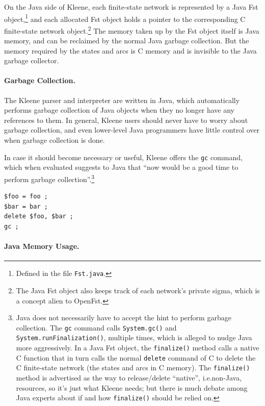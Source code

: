 \documentclass[letterpaper,12pt]{article}
\def\CPP{{C\nolinebreak[4]\hspace{-.08em}\raisebox{.3ex}{\footnotesize\bf
+}\nolinebreak\hspace{-.1em}\raisebox{.3ex}{\footnotesize\bf +}}}
\begin{document}
On the Java side of Kleene, each finite-state network is represented by a
Java Fst object,\footnote{Defined in the file \texttt{Fst.java}.} and
each allocated Fst object holds a pointer to the corresponding \CPP{}
finite-state network object.\footnote{The Java Fst object also keeps
track of each network's private sigma, which is a concept alien to
OpenFst.}  The memory taken up by the Fst object itself is Java memory,
and can be reclaimed by the normal Java garbage collection.  But the
memory required by the states and arcs is \CPP{} memory and is invisible
to the Java garbage collector.

\paragraph{Garbage Collection.}

The Kleene parser and interpreter are written in Java, which
automatically performs garbage collection of Java objects when they no
longer have any references to them.  In general, Kleene users should
never have to worry about garbage collection, and even lower-level Java
programmers have little control over when garbage collection is done.  

In case it should become necessary or useful, Kleene offers the
\texttt{gc} command, which when evaluated suggests to Java that ``now
would be a good time to perform garbage collection''.\footnote{Java does
not necessarily have to accept the hint to perform garbage collection.
The \texttt{gc} command calls \texttt{System.gc()} and
\texttt{System.runFinalization()}, multiple times, which is alleged to
nudge Java more aggressively.  In a Java Fst object, the
\texttt{finalize()} method calls a native \CPP{} function that in turn
calls the normal \texttt{delete} command of \CPP{} to delete the \CPP{}
finite-state network (the states and arcs in \CPP{} memory). The
\texttt{finalize()} method is advertised as the way to release/delete
``native'', i.e.\@ non-Java, resources, so it's just what Kleene needs;
but there is much debate among Java experts about if and how
\texttt{finalize()} should be relied on.}

\begin{samepage}
\begin{Verbatim}[fontsize=\small]
$foo = foo ;
$bar = bar ;
delete $foo, $bar ;
gc ;
\end{Verbatim}
\end{samepage}

\paragraph{Java Memory Usage.}
\end{document}
